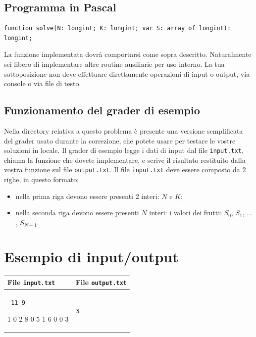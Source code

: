 \documentclass[a4paper,11pt]{article}
\newcommand{\file}[1]{\texttt{#1}}
\newcommand{\esempio}[2]{
\noindent\begin{minipage}{\textwidth}
\begin{tabular}{|p{11cm}|p{5cm}|}
    \hline
    \textbf{File \file{input.txt}} & \textbf{File \file{output.txt}}\\
    \hline
    \tt \small #1 &
    \tt \small #2 \\
    \hline
\end{tabular}
\end{minipage}
}
\begin{document}
\subsection*{Programma in Pascal}
\begin{verbatim}
function solve(N: longint; K: longint; var S: array of longint): longint;
\end{verbatim}

La funzione implementata dovrà comportarsi come sopra
descritto. Naturalmente sei libero di implementare altre routine
ausiliarie per uso interno. La tua sottoposizione non deve effettuare
direttamente operazioni di input o output, via console o via file di
testo.

\subsection*{Funzionamento del grader di esempio}
Nella directory relativa a questo problema è presente una versione
semplificata del grader usato durante la correzione, che potete usare
per testare le vostre soluzioni in locale. Il grader di esempio legge
i dati di input dal file \file{input.txt}, chiama la funzione che
dovete implementare, e scrive il risultato restituito dalla vostra
funzione sul file \file{output.txt}. Il file \file{input.txt} deve
essere composto da $2$ righe, in questo formato:
\begin{itemize}
\item nella prima riga devono essere presenti $2$ interi: $N$ e $K$;
\item nella seconda riga devono essere presenti $N$ interi: i valori
  dei frutti: $S_0$, $S_1$, $\dots$, $S_{N-1}$.
\end{itemize}

\section*{Esempio di input/output}
\setlength{\tabcolsep}{6pt}
\esempio{
11 9

1 0 2 8 0 5 1 6 0 0 3
}{3}
\end{document}
